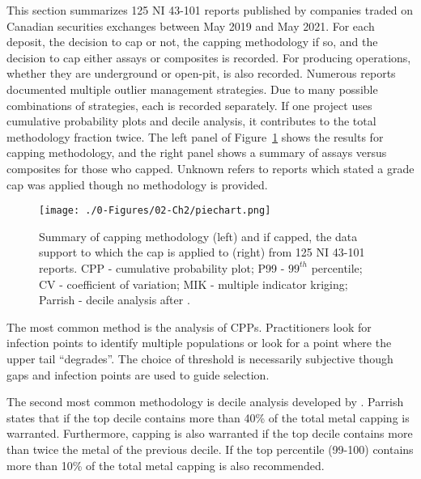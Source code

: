 This section summarizes 125 NI 43-101 reports published by companies traded on Canadian securities exchanges between May 2019 and May 2021. For each deposit, the decision to cap or not, the capping methodology if so, and the decision to cap either assays or composites is recorded. For producing operations, whether they are underground or open-pit, is also recorded. Numerous reports documented multiple outlier management strategies. Due to many possible combinations of strategies, each is recorded separately. If one project uses cumulative probability plots and decile analysis, it contributes to the total methodology fraction twice. The left panel of Figure~\ref{fig:piechart} shows the results for capping methodology, and the right panel shows a summary of assays versus composites for those who capped. Unknown refers to reports which stated a grade cap was applied though no methodology is provided.

\begin{figure}[htb!]
    \centering
    \texttt{[image: ./0-Figures/02-Ch2/piechart.png]}
    \caption{Summary of capping methodology (left) and if capped, the data support to which the cap is applied to (right) from 125 NI 43-101 reports. CPP - cumulative probability plot; P99 - $99^{th}$ percentile; CV - coefficient of variation; MIK - multiple indicator kriging; Parrish - decile analysis after \cite{parrish1997geologist}.}
    \label{fig:piechart}
\end{figure}

The most common method is the analysis of \glspl{CPP}. Practitioners look for infection points to identify multiple populations or look for a point where the upper tail ``degrades''. The choice of threshold is necessarily subjective though gaps and infection points are used to guide selection.


The second most common methodology is decile analysis developed by \cite{parrish1997geologist}. Parrish states that if the top decile contains more than 40\% of the total metal capping is warranted. Furthermore, capping is also warranted if the top decile contains more than twice the metal of the previous decile. If the top percentile (99-100) contains more than 10\% of the total metal capping is also recommended.

